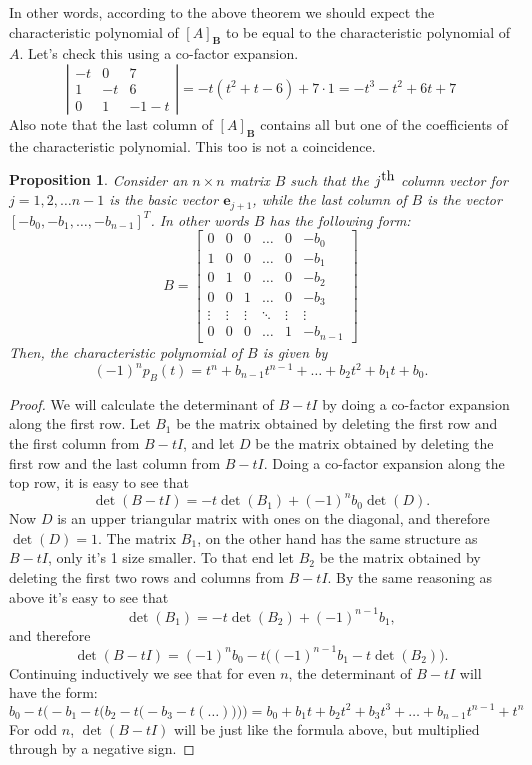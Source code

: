 \documentclass[12pt]{article}
\newcommand{\ve}{\mathbf{e}}
\newcommand{\bB}{{\mathbf{B}}}
\newcommand{\lb}{\left[}
\newcommand{\rb}{\right]}
\newtheorem{proposition}{Proposition}
\begin{document}
 In other words, according to the above theorem we should expect the
 characteristic polynomial of $[A]_\bB$ to be equal to the
 characteristic polynomial of $A$.  Let's check this using a co-factor
 expansion.
 $$
 \left|
 \begin{array}{ccc}
 -t & 0  & 7 \\
 1  & -t & 6 \\
 0  & 1  & -1-t
 \end{array}
 \right|
 = -t (t^2+t-6) + 7\cdot 1 = -t^3-t^2+6t + 7
 $$
 Also note that the last column of $[A]_\bB$ contains all but one of
 the coefficients of the characteristic polynomial.  This too is not a
 coincidence. 
 \begin{proposition}
 \label{prop:ratform}
   Consider an $n\times n$ matrix $B$ such that the $j^{\mbox{\rm th}}$
   column vector for $j=1,2,\ldots n-1$ is the basic vector
   $\ve_{j+1}$, while the last column of $B$ is the vector $[-b_0,
   -b_1, \ldots , -b_{n-1} ]^T$.  In other words $B$ has the following
   form:
 $$
 B=\lb\begin{array}{cccccc}
 0 & 0 & 0 & \ldots & 0 & -b_0 \\
 1 & 0 & 0 & \ldots & 0 & -b_1 \\
 0 & 1 & 0 & \ldots & 0 & -b_2 \\
 0 & 0 & 1 & \ldots & 0 & -b_3 \\
 \vdots & \vdots & \vdots &  \ddots & \vdots & \vdots \\
 0 & 0 & 0 & \ldots & 1 & -b_{n-1}
 \end{array}\rb
 $$
 Then, the characteristic polynomial of $B$ is given by
 $$(-1)^n p_B(t) = t^n + b_{n-1}t^{n-1} + \ldots + b_2 t^2 + b_1 t +
 b_0.$$
 \end{proposition}
\begin{proof}
  We will calculate the determinant of $B-tI$ by doing a co-factor
  expansion along the first row.  Let $B_1$ be the matrix obtained by
  deleting the first row and the first column from $B-tI$, and let $D$
  be the matrix obtained by deleting the first row and the last column
  from $B-tI$.  Doing a co-factor expansion along the top row, it is
  easy to see that
  $$\det(B-tI) = -t \det(B_1) +(-1)^n b_0 \det(D).$$
  Now $D$ is an
  upper triangular matrix with ones on the diagonal, and therefore
  $\det(D)=1$.  The matrix $B_1$, on the other hand has the same
  structure as $B-tI$, only it's 1 size smaller.  To that end let
  $B_2$ be the matrix obtained by deleting the first two rows and
  columns from $B-tI$.  By the same reasoning as above it's easy to
  see that
  $$\det(B_1) = -t \det(B_2) + (-1)^{n-1} b_1,$$
  and therefore
  $$\det(B-tI) = (-1)^n b_0 - t\Big( (-1)^{n-1} b_1 -t
  \det(B_2)\Big).$$
  Continuing inductively we see that for even $n$,
  the determinant of $B-tI$ will have the form:
   $$b_0-t\Bigg(-b_1 - t\Big( b_2 - t \big( -b_3 - t ( \ldots ) \big)
   \Big) \Bigg) = b_0 + b_1 t + b_2 t^2 + b_3 t^3 + \ldots + b_{n-1}
   t^{n-1} + t^n $$
   For odd $n$, $\det(B-tI)$ will be just like the
   formula above, but multiplied through by a negative sign.
\end{proof}
\end{document}

